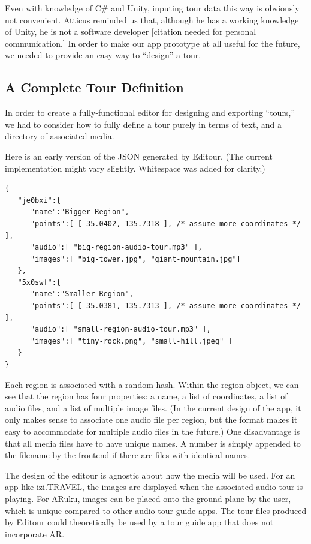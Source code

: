 \documentclass[a4paper, 10pt, american, titlepage]{article}
\begin{document}
Even with knowledge of C\# and Unity, inputing tour data this way is obviously
not convenient. Atticus reminded us that, although he has a working knowledge
of Unity, he is not a software developer [citation needed for personal
communication.] In order to make our app prototype at all useful for the
future, we needed to provide an easy way to ``design'' a tour.

\subsection{A Complete Tour Definition}
\label{sec:tourDefinition}

In order to create a fully-functional editor for designing and exporting
``tours,'' we had to consider how to fully define a tour purely in terms
of text, and a directory of associated media.

Here is an early version of the JSON generated by Editour. (The current
implementation might vary slightly. Whitespace was added for clarity.)

\begin{verbatim}
{
   "je0bxi":{
      "name":"Bigger Region",
      "points":[ [ 35.0402, 135.7318 ], /* assume more coordinates */ ],
      "audio":[ "big-region-audio-tour.mp3" ],
      "images":[ "big-tower.jpg", "giant-mountain.jpg"]
   },
   "5x0swf":{
      "name":"Smaller Region",
      "points":[ [ 35.0381, 135.7313 ], /* assume more coordinates */ ],
      "audio":[ "small-region-audio-tour.mp3" ],
      "images":[ "tiny-rock.png", "small-hill.jpeg" ]
   }
}
\end{verbatim}

Each region is associated with a random hash. Within the region object, we can
see that the region has four properties: a name, a list of coordinates, a list
of audio files, and a list of multiple image files. (In the current design of
the app, it only makes sense to associate one audio file per region, but the
format makes it easy to accommodate for multiple audio files in the future.)
One disadvantage is that all media files have to have unique names.  A number
is simply appended to the filename by the frontend if there are files with
identical names.

The design of the editour is agnostic about how the media will be used.  For
an app like izi.TRAVEL, the images are displayed when the associated audio
tour is playing. For ARuku, images can be placed onto the ground plane by the
user, which is unique compared to other audio tour guide apps. The tour files
produced by Editour could theoretically be used by a tour guide app that does
not incorporate AR.
\end{document}
